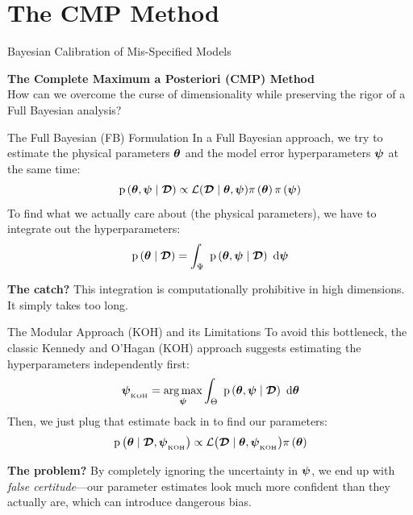 \section[CMP Method]{The CMP Method}

\begin{frame}{Bayesian Calibration of Mis-Specified Models}
    \begin{center}
        \Large \textbf{The Complete Maximum a Posteriori (CMP) Method} \\[0.5cm]
        \normalsize How can we overcome the curse of dimensionality while preserving the rigor of a Full Bayesian analysis?
    \end{center}
\end{frame}

\begin{frame}{The Full Bayesian (FB) Formulation}
    In a Full Bayesian approach, we try to estimate the physical parameters $\boldsymbol{\theta}$ and the model error hyperparameters $\boldsymbol{\psi}$ at the same time:
    \begin{equation*}
        \p{\btheta, \bpsi \mid \data} \propto \likelihood{\data \mid \btheta, \bpsi} \prior{\btheta} \prior{\bpsi}
    \end{equation*}
    To find what we actually care about (the physical parameters), we have to integrate out the hyperparameters:
    \begin{equation*}
        \text{p} \left( \boldsymbol{\theta} \mid \boldsymbol{\mathcal{D}} \right) = \displaystyle\int_{\Psi} \ \text{p} \left( \boldsymbol{\theta}, \boldsymbol{\psi} \mid \boldsymbol{\mathcal{D}} \right) \ \text{d} \boldsymbol{\psi}
    \end{equation*}
    
    \vspace{0.3cm}
    \textbf{The catch?} This integration is computationally prohibitive in high dimensions. It simply takes too long.
\end{frame}

\begin{frame}{The Modular Approach (KOH) and its Limitations}
    To avoid this bottleneck, the classic Kennedy and O'Hagan (KOH) approach suggests estimating the hyperparameters independently first:
    \begin{equation*}
        \boldsymbol{\psi}_{_\text{KOH}} = \operatorname*{arg\,max}_{\boldsymbol{\psi}} \displaystyle \int_{\Theta} \ \text{p} \left( \boldsymbol{\theta}, \boldsymbol{\psi} \mid \boldsymbol{\mathcal{D}} \right) \ \text{d} \boldsymbol{\theta}
    \end{equation*}
    Then, we just plug that estimate back in to find our parameters:
    \begin{equation*}
        \p{\btheta \mid \data, \psikoh} \propto \likelihood{\data \mid \btheta, \psikoh} \prior{\btheta}
    \end{equation*}
    
    \vspace{0.3cm}
    \textbf{The problem?} By completely ignoring the uncertainty in $\boldsymbol{\psi}$, we end up with \textit{false certitude}—our parameter estimates look much more confident than they actually are, which can introduce dangerous bias.
\end{frame}

